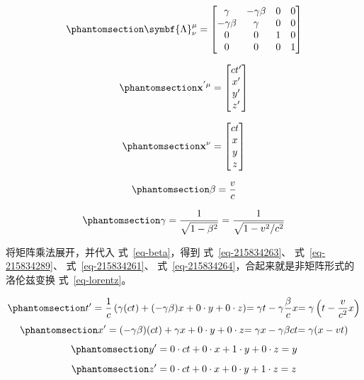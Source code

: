 \documentclass[
  chinese,
  a4paper,
  UTF8,
  12pt,
  oneside,
  openany]{ctexbook}
\begin{document}
\begin{equation}\protect\phantomsection\label{eq-Lambda-define}{
\symbf{\Lambda}_{\nu}^{\mu} = \begin{bmatrix}
\gamma & -\gamma\beta & 0 & 0 \\
-\gamma\beta & \gamma & 0 & 0 \\
0 & 0 & 1 & 0 \\
0 & 0 & 0 & 1
\end{bmatrix}
}\end{equation}

\begin{equation}\protect\phantomsection\label{eq-x-prime}{
\mathbf{x}^{'\mu} = \begin{bmatrix}
ct' \\
x' \\
y' \\
z'
\end{bmatrix}
}\end{equation}

\begin{equation}\protect\phantomsection\label{eq-x}{
\mathbf{x}^{\nu} = \begin{bmatrix}
ct \\
x \\
y \\
z
\end{bmatrix}
}\end{equation}

\begin{equation}\protect\phantomsection\label{eq-beta}{
\beta = \frac{v}{c}
}\end{equation}

\begin{equation}\protect\phantomsection\label{eq-gamma}{
\gamma = \frac{1}{\sqrt{1 - \beta^{2}}} = \frac{1}{\sqrt{1 - v^{2}/c^{2}}}
}\end{equation}

将矩阵乘法展开，并代入 式~\ref{eq-beta}，得到 式~\ref{eq-215834263}、
式~\ref{eq-215834289}、 式~\ref{eq-215834261}、
式~\ref{eq-215834264}，合起来就是非矩阵形式的洛伦兹变换
式~\ref{eq-lorentz}。

\begin{equation}\protect\phantomsection\label{eq-215834263}{
{t' = \frac{1}{c}\left( \gamma(ct) + ( - \gamma\beta)x + 0 \cdot y + 0 \cdot z \right)
  }{= \gamma t - \gamma\frac{\beta}{c}x
  }{= \gamma\left( t - \frac{v}{c^{2}}x \right)}
}\end{equation}
\begin{equation}\protect\phantomsection\label{eq-215834289}{
{x' = ( - \gamma\beta)(ct) + \gamma x + 0 \cdot y + 0 \cdot z
  }{= \gamma x - \gamma\beta ct
  }{= \gamma(x - vt)}
}\end{equation}
\begin{equation}\protect\phantomsection\label{eq-215834261}{
y' = 0 \cdot ct + 0 \cdot x + 1 \cdot y + 0 \cdot z = y
}\end{equation}
\begin{equation}\protect\phantomsection\label{eq-215834264}{
z' = 0 \cdot ct + 0 \cdot x + 0 \cdot y + 1 \cdot z = z
}\end{equation}
\end{document}
